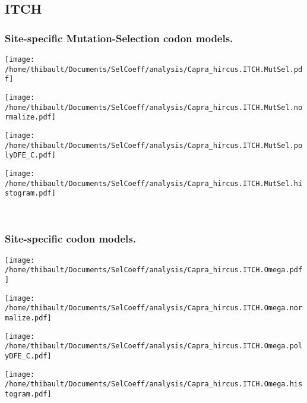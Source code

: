 \subsection{ITCH} 
 
\subsubsection*{Site-specific Mutation-Selection codon models.} 
\begin{minipage}{0.49\linewidth} 
\texttt{[image: /home/thibault/Documents/SelCoeff/analysis/Capra\_hircus.ITCH.MutSel.pdf]} 
\end{minipage}
\begin{minipage}{0.49\linewidth} 
\texttt{[image: /home/thibault/Documents/SelCoeff/analysis/Capra\_hircus.ITCH.MutSel.normalize.pdf]} 
\end{minipage}
\begin{minipage}{0.49\linewidth} 
\texttt{[image: /home/thibault/Documents/SelCoeff/analysis/Capra\_hircus.ITCH.MutSel.polyDFE\_C.pdf]} 
\end{minipage}
\begin{minipage}{0.49\linewidth} 
\texttt{[image: /home/thibault/Documents/SelCoeff/analysis/Capra\_hircus.ITCH.MutSel.histogram.pdf]} 
\end{minipage}
\\ 
\subsubsection*{Site-specific codon models.} 
\begin{minipage}{0.49\linewidth} 
\texttt{[image: /home/thibault/Documents/SelCoeff/analysis/Capra\_hircus.ITCH.Omega.pdf]} 
\end{minipage}
\begin{minipage}{0.49\linewidth} 
\texttt{[image: /home/thibault/Documents/SelCoeff/analysis/Capra\_hircus.ITCH.Omega.normalize.pdf]} 
\end{minipage}
\begin{minipage}{0.49\linewidth} 
\texttt{[image: /home/thibault/Documents/SelCoeff/analysis/Capra\_hircus.ITCH.Omega.polyDFE\_C.pdf]} 
\end{minipage}
\begin{minipage}{0.49\linewidth} 
\texttt{[image: /home/thibault/Documents/SelCoeff/analysis/Capra\_hircus.ITCH.Omega.histogram.pdf]} 
\end{minipage}
\\ 
